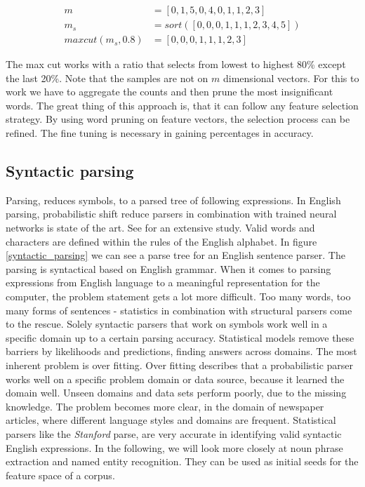       \begin{equation}
      \begin{split}
        m &= [0, 1, 5, 0, 4, 0, 1, 1, 2, 3] \\
        m_s &= sort( [0, 0, 0, 1, 1, 1, 2, 3, 4, 5] ) \\
        maxcut(m_s, 0.8) &= [0, 0, 0, 1, 1, 1, 2, 3]
      \end{split}
      \end{equation}

    The max cut works with a ratio that selects from lowest to highest 80\% except the last 20\%. Note that the samples are not on $m$ dimensional vectors. For this to work we have to aggregate the counts and then prune the most insignificant words. The great thing of this approach is, that it can follow any feature selection strategy. By using word pruning on feature vectors, the selection process can be refined. The fine tuning is necessary in gaining percentages in accuracy.

  \subsection{Syntactic parsing}
  \label{sec:syntactic_parsing}

  Parsing, reduces symbols, to a parsed tree of following expressions. In English parsing, probabilistic shift reduce parsers in combination with trained neural networks is state of the art. See \cite{ShiftReduceParsingStanford} for an extensive study. Valid words and characters are defined within the rules of the English alphabet. In figure \ref{syntactic_parsing} we can see a parse tree for an English sentence parser. The parsing is syntactical based on English grammar. When it comes to parsing expressions from English language to a meaningful representation for the computer, the problem statement gets a lot more difficult. Too many words, too many forms of sentences - statistics in combination with structural parsers come to the rescue. Solely syntactic parsers that work on symbols work well in a specific domain up to a certain parsing accuracy. Statistical models remove these barriers by likelihoods and predictions, finding answers across domains. The most inherent problem is over fitting. Over fitting describes that a probabilistic parser works well on a specific problem domain or data source, because it learned the domain well. Unseen domains and data sets perform poorly, due to the missing knowledge. The problem becomes more clear, in the domain of newspaper articles, where different language styles and domains are frequent. Statistical parsers like the \emph{Stanford} parse, are very accurate in identifying valid syntactic English expressions. In the following, we will look more closely at noun phrase extraction and named entity recognition. They can be used as initial seeds for the feature space of a corpus.

